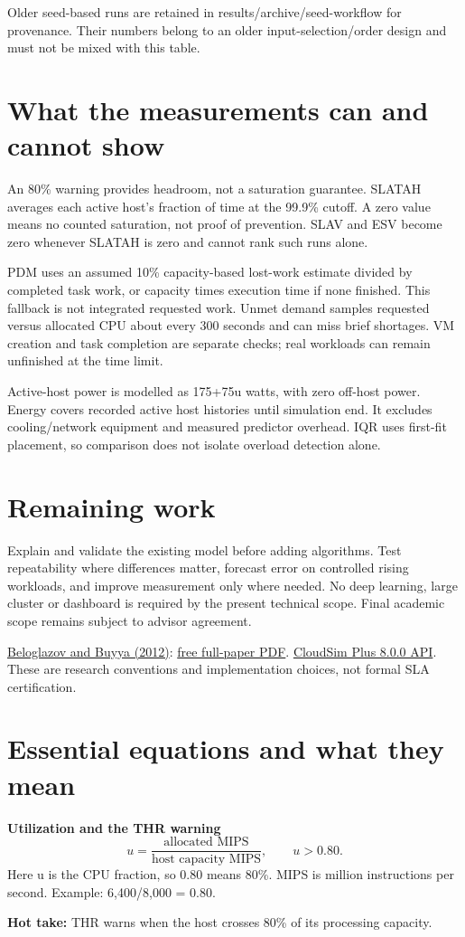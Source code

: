 \documentclass[11pt,a4paper]{article}
\newcommand{\hot}[1]{\par\textbf{Hot take:} #1\par}
\begin{document}
Older seed-based runs are retained in results/archive/seed-workflow for provenance. Their numbers belong to an older input-selection/order design and must not be mixed with this table.
\enlargethispage{3\baselineskip}
\section{What the measurements can and cannot show}
An 80\% warning provides headroom, not a saturation guarantee. SLATAH averages each active host's fraction of time at the 99.9\% cutoff. A zero value means no counted saturation, not proof of prevention. SLAV and ESV become zero whenever SLATAH is zero and cannot rank such runs alone.

PDM uses an assumed 10\% capacity-based lost-work estimate divided by completed task work, or capacity times execution time if none finished. This fallback is not integrated requested work. Unmet demand samples requested versus allocated CPU about every 300 seconds and can miss brief shortages. VM creation and task completion are separate checks; real workloads can remain unfinished at the time limit.

Active-host power is modelled as 175+75u watts, with zero off-host power. Energy covers recorded active host histories until simulation end. It excludes cooling/network equipment and measured predictor overhead. IQR uses first-fit placement, so comparison does not isolate overload detection alone.
\section{Remaining work}
Explain and validate the existing model before adding algorithms. Test repeatability where differences matter, forecast error on controlled rising workloads, and improve measurement only where needed. No deep learning, large cluster or dashboard is required by the present technical scope. Final academic scope remains subject to advisor agreement.

\href{https://doi.org/10.1002/cpe.1867}{Beloglazov and Buyya (2012)}: \href{https://beloglazov.info/papers/2012-optimal-algorithms-ccpe.pdf}{free full-paper PDF}. \href{https://javadoc.io/doc/org.cloudsimplus/cloudsim-plus/8.0.0/index.html}{CloudSim Plus 8.0.0 API}. These are research conventions and implementation choices, not formal SLA certification.
\newpage
\section{Essential equations and what they mean}
\textbf{Utilization and the THR warning}
\[u=\frac{\text{allocated MIPS}}{\text{host capacity MIPS}},\qquad u>0.80.\]
Here u is the CPU fraction, so 0.80 means 80\%. MIPS is million instructions per second. Example: 6,400/8,000 = 0.80.
\hot{THR warns when the host crosses 80\% of its processing capacity.}
\end{document}
